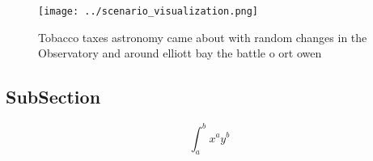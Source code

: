 \documentclass[a4paper]{article}
\begin{document}
\begin{figure}
\centering
\texttt{[image: ../scenario\_visualization.png]}
\caption{Tobacco taxes astronomy came about with random changes in the Observatory and around elliott bay the battle o ort owen 
}
\end{figure}
 
\subsection{SubSection}

\[ \int_{a}^{b}{x^{a}y^{b}} \]
\end{document}
